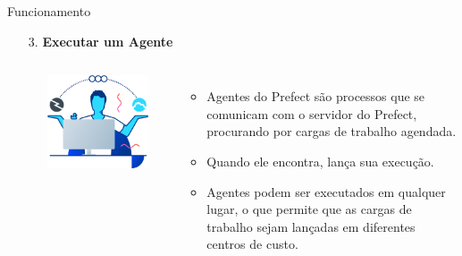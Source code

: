\documentclass[t,serif]{beamer}
\begin{document}
	\begin{frame}{Funcionamento}
		\begin{enumerate}
			\item[3.] \textbf{Executar um Agente}
			\begin{columns}
					\\
					\begin{center}
						\includegraphics[width=\linewidth]{figs/2_3.png}
					\end{center}
					\\
					\begin{itemize}
						\item Agentes do Prefect são processos que se comunicam com o servidor do Prefect, procurando por cargas de trabalho agendada.
						\item Quando ele encontra, lança sua execução.
						\item Agentes podem ser executados em qualquer lugar, o que permite que as cargas de trabalho sejam lançadas em diferentes centros de custo.
					\end{itemize}
			\end{columns}
		\end{enumerate}
	\end{frame}
	
\end{document}
